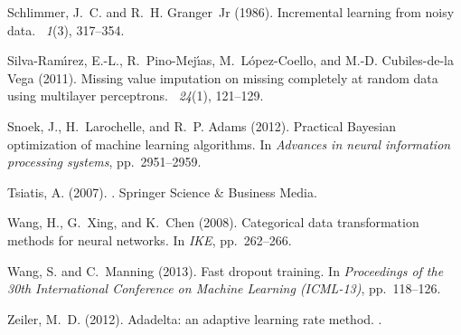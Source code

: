 \documentclass[10pt]{book}
\theoremstyle{definition}
\begin{document}
\begin{thebibliography}{11}
Schlimmer, J.~C. and R.~H. Granger~Jr (1986).
\newblock Incremental learning from noisy data.
~{\em 1\/}(3), 317--354.

Silva-Ram{\'\i}rez, E.-L., R.~Pino-Mej{\'\i}as, M.~L{\'o}pez-Coello, and M.-D.
  Cubiles-de-la Vega (2011).
\newblock Missing value imputation on missing completely at random data using
  multilayer perceptrons.
~{\em 24\/}(1), 121--129.

Snoek, J., H.~Larochelle, and R.~P. Adams (2012).
\newblock Practical {B}ayesian optimization of machine learning algorithms.
\newblock In {\em Advances in neural information processing systems}, pp.\
  2951--2959.

Tsiatis, A. (2007).
.
\newblock Springer Science \& Business Media.

Wang, H., G.~Xing, and K.~Chen (2008).
\newblock Categorical data transformation methods for neural networks.
\newblock In {\em IKE}, pp.\  262--266.

Wang, S. and C.~Manning (2013).
\newblock Fast dropout training.
\newblock In {\em Proceedings of the 30th International Conference on Machine
  Learning (ICML-13)}, pp.\  118--126.

Zeiler, M.~D. (2012).
\newblock Adadelta: an adaptive learning rate method.
.

\end{thebibliography}

%
%

%
\end{document}
